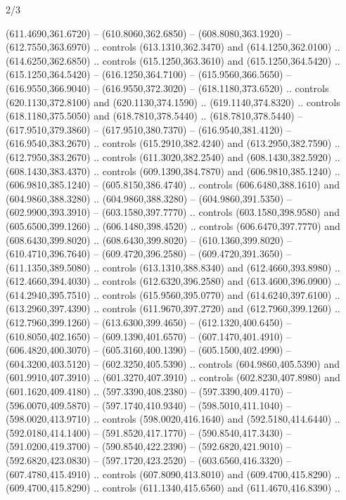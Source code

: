 \begin{flagdescription}{2/3}
\begin{scope}[xshift=0.5\flaglength,yshift=0.5\flagwidth,scale=\flagwidth/638.38]
\begin{scope}[y=0.80pt, x=0.80pt, yscale=-1,shift={(-600,-400)}]
\begin{scope}[shift={(-0.02,2.173)}]
  (611.4690,361.6720) -- (610.8060,362.6850) -- (608.8080,363.1920) --
  (612.7550,363.6970) .. controls (613.1310,362.3470) and (614.1250,362.0100) ..
  (614.6250,362.6850) .. controls (615.1250,363.3610) and (615.1250,364.5420) ..
  (615.1250,364.5420) -- (616.1250,364.7100) -- (615.9560,366.5650) --
  (616.9550,366.9040) -- (616.9550,372.3020) -- (618.1180,373.6520) .. controls
  (620.1130,372.8100) and (620.1130,374.1590) .. (619.1140,374.8320) .. controls
  (618.1180,375.5050) and (618.7810,378.5440) .. (618.7810,378.5440) --
  (617.9510,379.3860) -- (617.9510,380.7370) -- (616.9540,381.4120) --
  (616.9540,383.2670) .. controls (615.2910,382.4240) and (613.2950,382.7590) ..
  (612.7950,383.2670) .. controls (611.3020,382.2540) and (608.1430,382.5920) ..
  (608.1430,383.4370) .. controls (609.1390,384.7870) and (606.9810,385.1240) ..
  (606.9810,385.1240) -- (605.8150,386.4740) .. controls (606.6480,388.1610) and
  (604.9860,388.3280) .. (604.9860,388.3280) -- (604.9860,391.5350) --
  (602.9900,393.3910) -- (603.1580,397.7770) .. controls (603.1580,398.9580) and
  (605.6500,399.1260) .. (606.1480,398.4520) .. controls (606.6470,397.7770) and
  (608.6430,399.8020) .. (608.6430,399.8020) -- (610.1360,399.8020) --
  (610.4710,396.7640) -- (609.4720,396.2580) -- (609.4720,391.3650) --
  (611.1350,389.5080) .. controls (613.1310,388.8340) and (612.4660,393.8980) ..
  (612.4660,394.4030) .. controls (612.6320,396.2580) and (613.4600,396.0900) ..
  (614.2940,395.7510) .. controls (615.9560,395.0770) and (614.6240,397.6100) ..
  (613.2960,397.4390) .. controls (611.9670,397.2720) and (612.7960,399.1260) ..
  (612.7960,399.1260) -- (613.6300,399.4650) -- (612.1320,400.6450) --
  (610.8050,402.1650) -- (609.1390,401.6570) -- (607.1470,401.4910) --
  (606.4820,400.3070) -- (605.3160,400.1390) -- (605.1500,402.4990) --
  (604.3200,403.5120) -- (602.3250,405.5390) .. controls (604.9860,405.5390) and
  (601.9910,407.3910) .. (601.3270,407.3910) .. controls (602.8230,407.8980) and
  (601.1620,409.4180) .. (597.3390,408.2380) -- (597.3390,409.4170) --
  (596.0070,409.5870) -- (597.1740,410.9340) -- (598.5010,411.1040) --
  (598.0020,413.9710) .. controls (598.0020,416.1640) and (592.5180,414.6440) ..
  (592.0180,414.1400) -- (591.8520,417.1770) -- (590.8540,417.3430) --
  (591.0200,419.3700) -- (590.8540,422.2390) -- (592.6820,421.9010) --
  (592.6820,423.0830) -- (597.1720,423.2520) -- (603.6560,416.3320) --
  (607.4780,415.4910) .. controls (607.8090,413.8010) and (609.4700,415.8290) ..
  (609.4700,415.8290) .. controls (611.1340,415.6560) and (611.4670,416.8390) ..

\end{scope}
\end{scope}
\end{scope}
\end{flagdescription}
